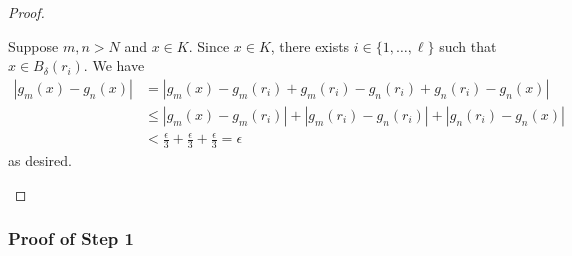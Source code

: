 \begin{proof}
\begin{enumerate}
            Suppose \( m,n > N  \) and \( x \in K  \). Since \( x \in K  \), there exists \( i \in \{ 1, \dots, \ell  \}  \) such that \( x \in {B}_{\delta}({r}_{i}) \). We have 
        \begin{align*}
            | {g}_{m}(x) - {g}_{n}(x) | &= | {g}_{m}(x) - {g}_{m}({r}_{i}) + {g}_{m}({r}_{i}) - {g}_{n}({r}_{i}) + {g}_{n}({r}_{i}) - {g}_{n}(x) |   \\
                                        &\leq | {g}_{m}(x) - {g}_{m}({r}_{i}) |  + | {g}_{m}({r}_{i}) - {g}_{n}({r}_{i}) |  + | {g}_{n}({r}_{i}) - {g}_{n}(x) | \\ 
                                        &< \frac{ \epsilon }{ 3 }  + \frac{ \epsilon }{ 3 }  + \frac{ \epsilon }{ 3 } = \epsilon
        \end{align*}
        as desired.
    \end{enumerate}
\end{proof}

\subsubsection{Proof of Step 1}

